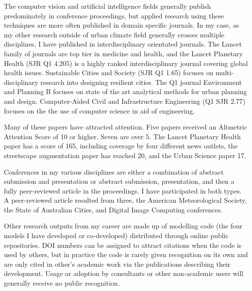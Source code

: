 The computer vision and artificial intelligence fields generally publish predominately in conference proceedings, but applied research using these techniques are more often published in domain specific journals. In my case, as my other research outside of urban climate field generally crosses multiple disciplines, I have published in interdisciplinary orientated journals. The Lancet family of journals are top tier in medicine and health, and the Lancet Planetary Health (SJR Q1 4.205) is a highly ranked interdisciplinary journal covering global health issues. Sustainable Cities and Society (SJR Q1 1.65) focuses on multi-disciplinary research into designing resilient cities. The Q1 journal Environment and Planning B focuses on state of the art analytical methods for urban planning and design. Computer-Aided Civil and Infrastructure Engineering (Q1 SJR 2.77) focuses on the the use of computer science in aid of engineering.

Many of these papers have attracted attention. Five papers received an Altmetric Attention Score of 10 or higher. Seven are over 5. The Lancet Planetary Health paper has a score of 165, including coverage by four different news outlets, the streetscape augmentation paper has reached 20, and the Urban Science paper 17.

Conferences in my various disciplines are either a combination of abstract submission and presentation or abstract submission, presentation, and then a fully peer-reviewed article in the proceedings. I have participated in both types. A peer-reviewed article resulted from three, the American Meteorological Society, the State of Australian Cities, and Digital Image Computing conferences.

Other research outputs from my career are made up of modelling code (the four models I have developed or co-developed) distributed through online public repositories. DOI numbers can be assigned to attract citations when the code is used by others, but in practice the code is rarely given recognition on its own and are only cited in other's academic work via the publications describing their development. Usage or adoption by consultants or other non-academic users will generally receive no public recognition.















%
